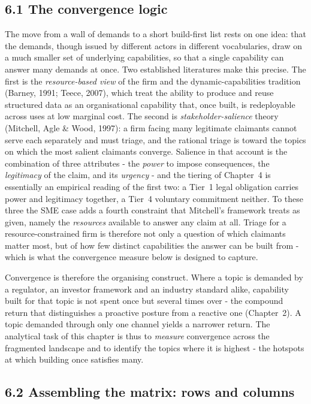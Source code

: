 \FloatBarrier
\subsection{6.1 The convergence logic}\label{cm-theory}

The move from a wall of demands to a short build-first list rests on one idea:
that the demands, though issued by different actors in different vocabularies,
draw on a much smaller set of underlying capabilities, so that a single
capability can answer many demands at once. Two established literatures make this
precise. The first is the \emph{resource-based view} of the firm and the
dynamic-capabilities tradition (Barney, 1991; Teece, 2007), which treat the
ability to produce and reuse structured data as an organisational capability that,
once built, is redeployable across uses at low marginal cost. The second is
\emph{stakeholder-salience} theory (Mitchell, Agle \& Wood, 1997): a firm facing
many legitimate claimants cannot serve each separately and must triage, and the
rational triage is toward the topics on which the most salient claimants converge.
Salience in that account is the combination of three attributes - the
\emph{power} to impose consequences, the \emph{legitimacy} of the claim, and its
\emph{urgency} - and the tiering of Chapter~4 is essentially an empirical reading
of the first two: a Tier~1 legal obligation carries power and legitimacy
together, a Tier~4 voluntary commitment neither. To these three the SME case adds
a fourth constraint that Mitchell's framework treats as given, namely the
\emph{resources} available to answer any claim at all. Triage for a
resource-constrained firm is therefore not only a question of which claimants
matter most, but of how few distinct capabilities the answer can be built from -
which is what the convergence measure below is designed to capture.

Convergence is therefore the organising construct. Where a topic is demanded by a
regulator, an investor framework and an industry standard alike, capability built for that topic is not spent once but several
times over - the compound return that distinguishes a proactive posture from a
reactive one (Chapter~2). A topic demanded through only one channel yields a
narrower return. The analytical task of this chapter is thus to \emph{measure}
convergence across the fragmented landscape and to identify the topics where it is
highest - the hotspots at which building once satisfies many.

\FloatBarrier
\subsection{6.2 Assembling the matrix: rows and
columns}\label{cm-matrix-build}


